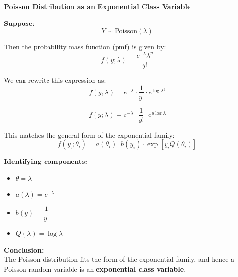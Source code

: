 \documentclass[12pt,a4paper]{article}
\begin{document}
\begin{example}
\textbf{Poisson Distribution as an Exponential Class Variable}

\textbf{Suppose:} \\
\[
Y \sim \text{Poisson}(\lambda)
\]

Then the probability mass function (pmf) is given by:
\[
f(y; \lambda) = \frac{e^{-\lambda} \lambda^y}{y!}
\]

We can rewrite this expression as:
\[
f(y; \lambda) = e^{-\lambda} \cdot \frac{1}{y!} \cdot e^{\log \lambda^y}
\]

\[
f(y; \lambda) = e^{-\lambda} \cdot \frac{1}{y!} \cdot e^{y \log \lambda}
\]

This matches the general form of the exponential family:
\[
f(y_i; \theta_i) = a(\theta_i) \cdot b(y_i) \cdot \exp\left[ y_i Q(\theta_i) \right]
\]

\textbf{Identifying components:}
\begin{itemize}
  \item \( \theta = \lambda \)
  \item \( a(\lambda) = e^{-\lambda} \)
  \item \( b(y) = \dfrac{1}{y!} \)
  \item \( Q(\lambda) = \log \lambda \)
\end{itemize}

\textbf{Conclusion:} \\
The Poisson distribution fits the form of the exponential family, and hence a Poisson random variable is an \textbf{exponential class variable}.
\end{example}
\end{document}
